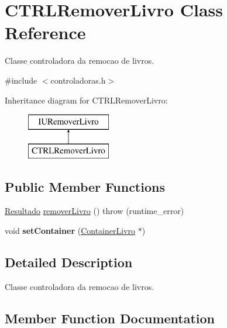 \hypertarget{classCTRLRemoverLivro}{}\section{C\+T\+R\+L\+Remover\+Livro Class Reference}
\label{classCTRLRemoverLivro}


Classe controladora da remocao de livros.  




{\ttfamily \#include $<$controladoras.\+h$>$}

Inheritance diagram for C\+T\+R\+L\+Remover\+Livro\+:\begin{figure}[H]
\begin{center}
\leavevmode
\includegraphics[height=2.000000cm]{classCTRLRemoverLivro}
\end{center}
\end{figure}
\subsection*{Public Member Functions}
\begin{DoxyCompactItemize}
\item 
\hyperlink{classResultado}{Resultado} \hyperlink{classCTRLRemoverLivro_adecee20558b737d5e4e5267c87455a97}{remover\+Livro} ()  throw (runtime\+\_\+error)
\item 
\mbox{\label{classCTRLRemoverLivro_a04e10ba0fa92fa40b71b183d9708207b}} 
void {\bfseries set\+Container} (\hyperlink{classContainerLivro}{Container\+Livro} $\ast$)
\end{DoxyCompactItemize}


\subsection{Detailed Description}
Classe controladora da remocao de livros. 

\subsection{Member Function Documentation}
\mbox{\label{classCTRLRemoverLivro_adecee20558b737d5e4e5267c87455a97}} 
